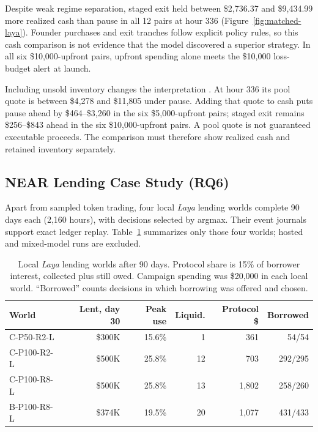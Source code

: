 Despite weak regime separation, staged exit held between \$2{,}736.37 and
\$9{,}434.99 more realized cash than pause in all 12 pairs at hour 336
(Figure~\ref{fig:matched-laya}). Founder purchases and exit tranches follow
explicit policy rules, so this cash comparison is not evidence that the 
model discovered a superior strategy. In all six \$10{,}000-upfront pairs,
upfront spending alone meets the \$10{,}000 loss-budget alert at launch.

Including unsold inventory changes the interpretation . At hour 336 its pool
quote is between \$4{,}278 and \$11{,}805 under pause. Adding that quote to cash
puts pause ahead by \$464--\$3{,}260 in the six \$5{,}000-upfront pairs; staged
exit remains \$256--\$843 ahead in the six \$10{,}000-upfront pairs. A pool
quote is not guaranteed executable proceeds. The comparison must therefore
show realized cash and retained inventory separately.

\subsection{NEAR Lending Case Study (RQ6)}\label{sec:res-lending}
Apart from sampled token trading, four local \textit{Laya} lending worlds
complete 90 days each (2{,}160 hours), with decisions selected by argmax.
Their event journals support exact ledger replay. Table~\ref{tab:lending}
summarizes only those four worlds; hosted and mixed-model runs are excluded.

\begin{table}[t]
\caption{Local \textit{Laya} lending worlds after 90 days. Protocol share is 15\% of borrower
interest, collected plus still owed. Campaign spending was \$20{,}000 in each local world. ``Borrowed'' counts decisions in which borrowing was offered
and chosen.}
\label{tab:lending}
\centering\footnotesize
\renewcommand{\arraystretch}{1.1}\setlength{\tabcolsep}{3pt}
\begin{tabular}{@{}lrrrrr@{}}
\toprule
World & Lent, day 30 & Peak use & Liquid. & Protocol \$ & Borrowed \\
\midrule
C-P50-R2-L & \$300K & 15.6\% & 1 & 361 & 54/54 \\
C-P100-R2-L & \$500K & 25.8\% & 12 & 703 & 292/295 \\
C-P100-R8-L & \$500K & 25.8\% & 13 & 1{,}802 & 258/260 \\
B-P100-R8-L & \$374K & 19.5\% & 20 & 1{,}077 & 431/433 \\
\bottomrule
\end{tabular}
\end{table}

